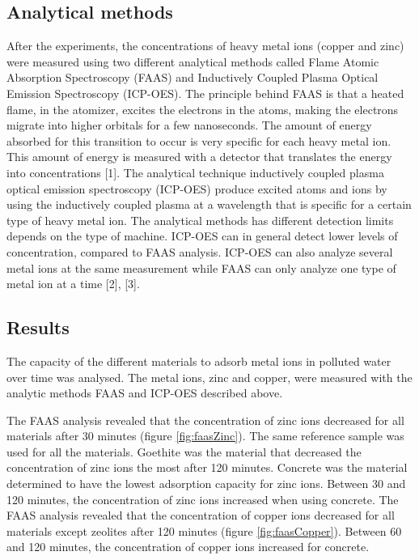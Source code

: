 \subsection{Analytical methods}
After the experiments, the concentrations of heavy metal ions (copper and zinc) were measured using two different analytical methods called Flame Atomic Absorption Spectroscopy (FAAS) and Inductively Coupled Plasma Optical Emission Spectroscopy (ICP-OES). The principle behind FAAS is that a heated flame, in the atomizer, excites the electrons in the atoms, making the electrons migrate into higher orbitals for a few nanoseconds. The amount of energy absorbed for this transition to occur is very specific for each heavy metal ion. This amount of energy is measured with a detector that translates the energy into concentrations [1]. The analytical technique inductively coupled plasma optical emission spectroscopy (ICP-OES) produce excited atoms and ions by using the inductively coupled plasma at a wavelength that is specific for a certain type of heavy metal ion. The analytical methods has different detection limits depends on the type of machine. ICP-OES can in general detect lower levels of concentration, compared to FAAS analysis. ICP-OES can also analyze several metal ions at the same measurement while FAAS can only analyze one type of metal ion at a time [2], [3].

 
\subsection{Results}
The capacity of the different materials to adsorb metal ions in polluted water over time was analysed. The metal ions, zinc and copper, were measured with the analytic methods FAAS and ICP-OES described above.

The FAAS analysis revealed that the concentration of zinc ions decreased for all materials after 30 minutes (figure \ref{fig:faasZinc}). The same reference sample was used for all the materials. Goethite was the material that decreased the concentration of zinc ions the most after 120 minutes. Concrete was the material determined to have the lowest adsorption capacity for zinc ions. Between 30 and 120 minutes, the concentration of zinc ions increased when using concrete. The FAAS analysis revealed that the concentration of copper ions decreased for all materials except zeolites after 120 minutes (figure \ref{fig:faasCopper}). Between 60 and 120 minutes, the concentration of copper ions increased for concrete.  


